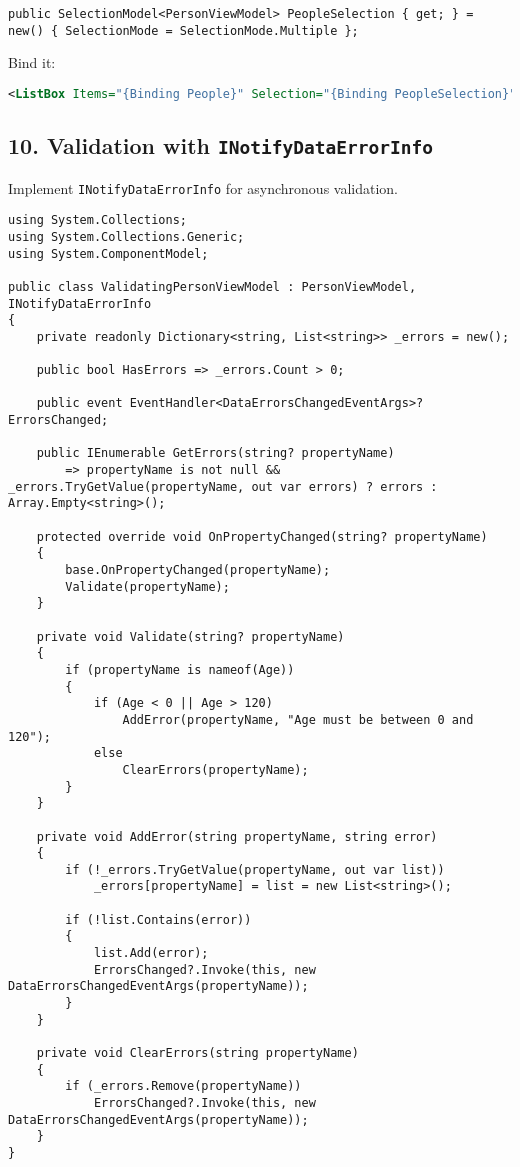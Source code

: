 \begin{lstlisting}
public SelectionModel<PersonViewModel> PeopleSelection { get; } = new() { SelectionMode = SelectionMode.Multiple };
\end{lstlisting}

Bind it:

\begin{lstlisting}[language=XML]
<ListBox Items="{Binding People}" Selection="{Binding PeopleSelection}"/>
\end{lstlisting}

\subsection{\texorpdfstring{10. Validation with
\texttt{INotifyDataErrorInfo}}{10. Validation with INotifyDataErrorInfo}}\label{validation-with-inotifydataerrorinfo}

Implement \passthrough{\lstinline!INotifyDataErrorInfo!} for
asynchronous validation.

\begin{lstlisting}
using System.Collections;
using System.Collections.Generic;
using System.ComponentModel;

public class ValidatingPersonViewModel : PersonViewModel, INotifyDataErrorInfo
{
    private readonly Dictionary<string, List<string>> _errors = new();

    public bool HasErrors => _errors.Count > 0;

    public event EventHandler<DataErrorsChangedEventArgs>? ErrorsChanged;

    public IEnumerable GetErrors(string? propertyName)
        => propertyName is not null && _errors.TryGetValue(propertyName, out var errors) ? errors : Array.Empty<string>();

    protected override void OnPropertyChanged(string? propertyName)
    {
        base.OnPropertyChanged(propertyName);
        Validate(propertyName);
    }

    private void Validate(string? propertyName)
    {
        if (propertyName is nameof(Age))
        {
            if (Age < 0 || Age > 120)
                AddError(propertyName, "Age must be between 0 and 120");
            else
                ClearErrors(propertyName);
        }
    }

    private void AddError(string propertyName, string error)
    {
        if (!_errors.TryGetValue(propertyName, out var list))
            _errors[propertyName] = list = new List<string>();

        if (!list.Contains(error))
        {
            list.Add(error);
            ErrorsChanged?.Invoke(this, new DataErrorsChangedEventArgs(propertyName));
        }
    }

    private void ClearErrors(string propertyName)
    {
        if (_errors.Remove(propertyName))
            ErrorsChanged?.Invoke(this, new DataErrorsChangedEventArgs(propertyName));
    }
}
\end{lstlisting}

